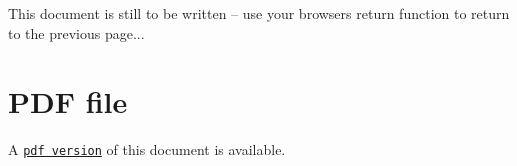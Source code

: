 This document is still to be written -- use your browser\textquotesingle{}s return function to return to the previous page...



 

 \hypertarget{index_pdf}{}\section{P\+D\+F file}\label{index_pdf}
A \href{../latex/refman.pdf}{\tt pdf version} of this document is available. 
